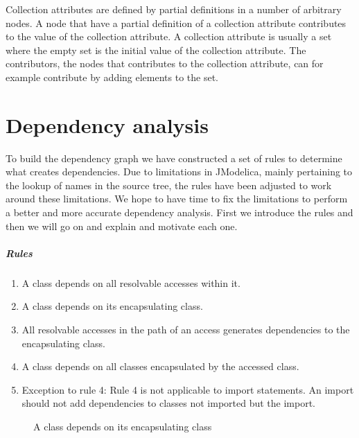 \documentclass{cslthse-msc}
\begin{document}
Collection attributes are defined by partial definitions in a number of arbitrary nodes. A node that have a partial definition of a collection attribute contributes to the value of the collection attribute. A collection attribute is usually a set where the empty set is the initial value of the collection attribute. The contributors, the nodes that contributes to the collection attribute, can for example contribute by adding elements to the set.~\cite{magnusson2007extending}

\chapter[Dependency analysis]{Dependency analysis}

To build the dependency graph we have constructed a set of rules to determine what creates dependencies. Due to limitations in JModelica, mainly pertaining to the lookup of names in the source tree, the rules have been adjusted to work around these limitations. We hope to have time to fix the limitations to perform a better and more accurate dependency analysis. First we introduce the rules and then we will go on and explain and motivate each one.

\paragraph{Rules}
\begin{enumerate}
\item A class depends on all resolvable accesses within it.
\item A class depends on its encapsulating class. 
\item All resolvable accesses in the path of an access generates dependencies to the encapsulating class.
\item A class depends on all classes encapsulated by the accessed class.
\item Exception to rule 4: Rule 4 is not applicable to import statements. An import should not add dependencies to classes not imported but the import.
\end{enumerate}


\begin{figure}[!htbp]
    \centering
    \qquad
    \subfloat{\raisebox{3.2 cm}{}}
    \caption{A class depends on its encapsulating class}
    \label{fig:parentGraph}
\end{figure}
\end{document}
